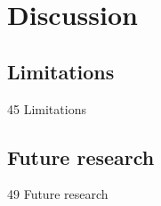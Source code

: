 \section{Discussion}
\label{sec:Discussion}



\subsection{Limitations}
{45 Limitations}

\subsection{Future research}
{49 Future research}